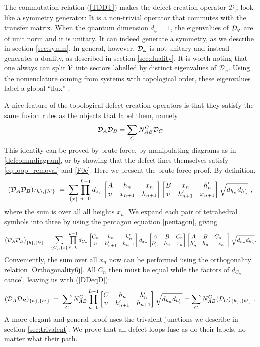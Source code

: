 The commutation relation (\ref{TDDT}) makes the defect-creation operator $\mathcal{D}_\varphi$ look like a symmetry generator: It is a non-trivial operator that commutes with the transfer matrix. When the quantum dimension $d_\varphi=1$, the eigenvalues of $\mathcal{D}_\varphi$ are of unit norm and it is unitary.  It can indeed generate a symmetry, as we describe in section \ref{sec:symm}. In general, however, $\mathcal{D}_\varphi$ is not unitary and instead generates a duality, as described in section \ref{sec:duality}. It is worth noting that one always can split ${\cal V}$ into sectors labelled by distinct eigenvalues of ${\mathcal D}_\varphi$. Using the nomenclature coming from systems with topological order, these eigenvalues label a global ``flux'' \cite{Feiguin2007}.  


A nice feature of the topological defect-creation operators is that they satisfy the same fusion rules as the objects that label them, namely
\begin{align}
\mathcal{D}_A \mathcal{D}_B = \sum_C N_{AB}^C \mathcal{D}_C
\label{DDeqD}
\end{align}
This identity can be proved by brute force,  by manipulating diagrams as in \eqref{defcommdiagram}, or by 
showing that the defect lines themselves satisfy \eqref{eq:loop_removal} and \eqref{F0c}. Here we present the brute-force proof. 
By definition,
\begin{align}
({\mathcal{D}}_A \mathcal{D}_B)_{\{h\},\{h'\}} \;=\;	\sum_{\{ x \}} \prod_{n=0}^{L-1} d_{x_n}\begin{bmatrix} A & h_n & x_n \\ \upsilon & x_{n+1} & h_{n+1} \end{bmatrix}
	 \begin{bmatrix} B & x_n & h'_n \\ \upsilon & h'_{n+1} & x_{n+1} \end{bmatrix} \sqrt{d_{h_n} d_{h'_n}}\ ,
	 \label{DADB}
\end{align}
where the sum is over all all heights $x_n$. We expand each pair of tetrahedral symbols into three by using the pentagon equation \eqref{pentagon}, giving
\begin{align*}
	\big({\mathcal{D}}_A \mathcal{D}_B\big)_{\{h\},\{h'\}} = \! \sum_{\{ C\},\{ x \}} \prod_{n=0}^{L-1} 
	d_{C_n} \begin{bmatrix} C_n & h_n & h_n' \\ \upsilon & h_{n+1}' & h_{n+1} \end{bmatrix}
	d_{x_n}  \begin{bmatrix} A & B & C_n \\ h_n' & h_n & x_n \end{bmatrix}\begin{bmatrix} A & B & C_{n-1} \\ h_n'& h_n & x_n \end{bmatrix} \sqrt{d_{h_n} d_{h'_n}}.
\end{align*}
Conveniently, the sum over all $x_n$  now can be performed using the orthogonality relation \eqref{Orthogonality6j}.
All $C_n$ then must be equal while the factors of $d_{C_n}$ cancel, leaving us with (\ref{DDeqD}): 
\begin{align} 
({\mathcal{D}}_A \mathcal{D}_B)_{\{h\},\{h'\}} \; = \; \sum_{C} N_{AB}^C \prod_{n=0}^{L-1} \begin{bmatrix} C & h_n & h_n' \\ \upsilon & h_{n+1}' & h_{n+1} \end{bmatrix}  \sqrt{d_{h_n} d_{h'_n}} = \sum_C N_{AB}^C (\mathcal{D}_C)_{\{h\},\{h'\}}\ .
\end{align}
A more elegant  and general proof uses the trivalent junctions we describe in section \ref{sec:trivalent}. We prove that all defect loops fuse as do their labels, no matter what their path. 

